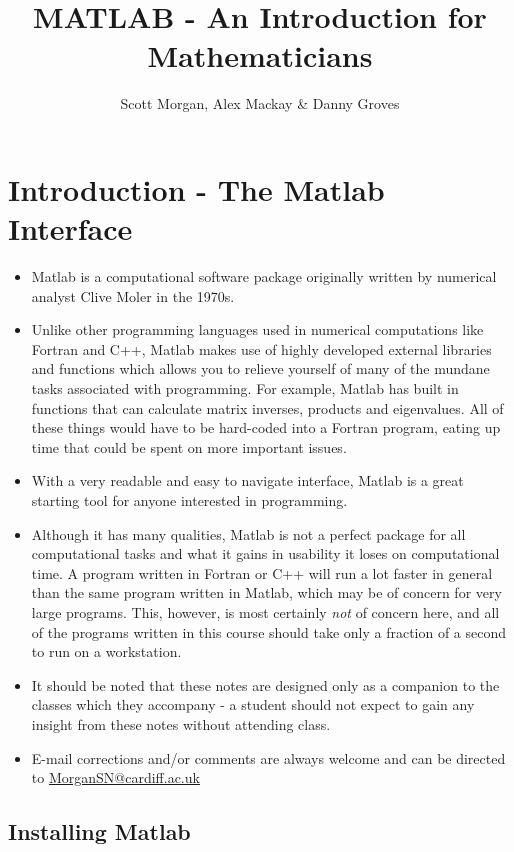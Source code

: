 \documentclass[12pt]{report}
\title{MATLAB - An Introduction for Mathematicians}
\author{Scott Morgan, Alex Mackay \& Danny Groves}
\begin{document}
\maketitle

\section*{Introduction - The Matlab Interface}

\begin{itemize}
\item Matlab is a computational software package originally written by numerical analyst Clive Moler in the 1970s. 
\item Unlike other programming languages used in numerical computations like Fortran and C++, Matlab makes use of highly developed external libraries and functions which allows you to relieve yourself of many of the mundane tasks associated with programming. For example, Matlab has built in functions that can calculate matrix inverses, products and eigenvalues. All of these things would have to be hard-coded into a Fortran program, eating up time that could be spent on more important issues. 
\item With a very readable and easy to navigate interface, Matlab is a great starting tool for anyone interested in programming. 
\item Although it has many qualities, Matlab is not a perfect package for all computational tasks and what it gains in usability it loses on computational time. A program written in Fortran or C++ will run a lot faster in general than the same program written in Matlab, which may be of concern for very large programs. This, however, is most certainly \textit{not} of concern here, and all of the programs written in this course should take only a fraction of a second to run on a workstation.
\item It should be noted that these notes are designed only as a companion to the classes which they accompany - a student should not expect to gain any insight from these notes without attending class.
\item E-mail corrections and/or comments are always welcome and can be directed to \url{MorganSN@cardiff.ac.uk}
\end{itemize}


\subsection*{Installing Matlab}
\end{document}
